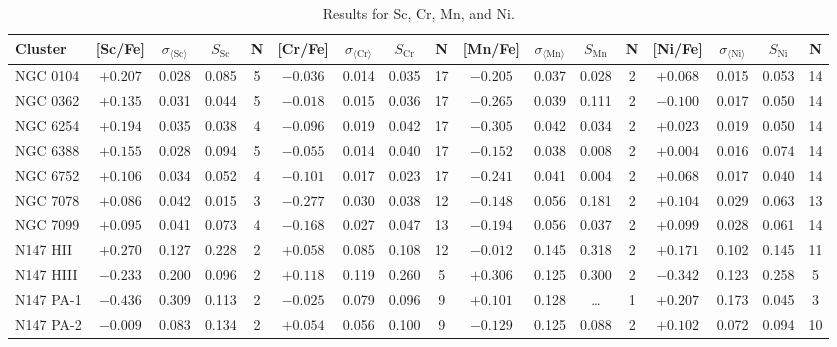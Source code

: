 \documentclass{aa}
\begin{document}
\begin{appendix}
\begin{table*}
\caption{Results for Sc, Cr, Mn, and Ni.}
\label{tab:results2v5}
\begin{adjustbox}{width=1\textwidth}
\centering
{\small
\begin{tabular}{l cccccccccccccccc}
\hline\hline
% 
Cluster       & [Sc/Fe] & $\sigma_{\langle\mathrm{Sc}\rangle}$ & $S_\mathrm{Sc}$ & N    & [Cr/Fe] & $\sigma_{\langle\mathrm{Cr}\rangle}$ & $S_\mathrm{Cr}$ & N     & [Mn/Fe] & $\sigma_{\langle\mathrm{Mn}\rangle}$ & $S_\mathrm{Mn}$ & N    & [Ni/Fe] & $\sigma_{\langle\mathrm{Ni}\rangle}$ & $S_\mathrm{Ni}$ & N    \\ \hline
NGC 0104      & $+0.207$ & 0.028 & 0.085 & 5 & $-0.036$ & 0.014 & 0.035 & 17 & $-0.205$ & 0.037 & 0.028 & 2 & $+0.068$ & 0.015 & 0.053 & 14 \\
NGC 0362      & $+0.135$ & 0.031 & 0.044 & 5 & $-0.018$ & 0.015 & 0.036 & 17 & $-0.265$ & 0.039 & 0.111 & 2 & $-0.100$ & 0.017 & 0.050 & 14 \\
NGC 6254      & $+0.194$ & 0.035 & 0.038 & 4 & $-0.096$ & 0.019 & 0.042 & 17 & $-0.305$ & 0.042 & 0.034 & 2 & $+0.023$ & 0.019 & 0.050 & 14 \\
NGC 6388      & $+0.155$ & 0.028 & 0.094 & 5 & $-0.055$ & 0.014 & 0.040 & 17 & $-0.152$ & 0.038 & 0.008 & 2 & $+0.004$ & 0.016 & 0.074 & 14 \\
NGC 6752      & $+0.106$ & 0.034 & 0.052 & 4 & $-0.101$ & 0.017 & 0.023 & 17 & $-0.241$ & 0.041 & 0.004 & 2 & $+0.068$ & 0.017 & 0.040 & 14 \\
NGC 7078      & $+0.086$ & 0.042 & 0.015 & 3 & $-0.277$ & 0.030 & 0.038 & 12 & $-0.148$ & 0.056 & 0.181 & 2 & $+0.104$ & 0.029 & 0.063 & 13 \\
NGC 7099      & $+0.095$ & 0.041 & 0.073 & 4 & $-0.168$ & 0.027 & 0.047 & 13 & $-0.194$ & 0.056 & 0.037 & 2 & $+0.099$ & 0.028 & 0.061 & 14 \\
N147 HII      & $+0.270$ & 0.127 & 0.228 & 2 & $+0.058$ & 0.085 & 0.108 & 12 & $-0.012$ & 0.145 & 0.318 & 2 & $+0.171$ & 0.102 & 0.145 & 11 \\
N147 HIII     & $-0.233$ & 0.200 & 0.096 & 2 & $+0.118$ & 0.119 & 0.260 & 5 & $+0.306$ & 0.125 & 0.300 & 2 & $-0.342$ & 0.123 & 0.258 & 5 \\
N147 PA-1     & $-0.436$ & 0.309 & 0.113 & 2 & $-0.025$ & 0.079 & 0.096 & 9 & $+0.101$ & 0.128 & \ldots & 1 & $+0.207$ & 0.173 & 0.045 & 3 \\
N147 PA-2     & $-0.009$ & 0.083 & 0.134 & 2 & $+0.054$ & 0.056 & 0.100 & 9 & $-0.129$ & 0.125 & 0.088 & 2 & $+0.102$ & 0.072 & 0.094 & 10 \\

\end{tabular}}
\end{adjustbox}
\end{table*}
\end{appendix}
\end{document}
